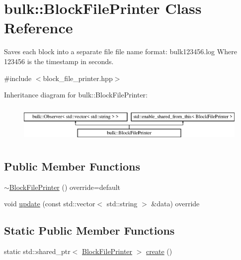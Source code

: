 \hypertarget{classbulk_1_1BlockFilePrinter}{}\section{bulk\+:\+:Block\+File\+Printer Class Reference}
\label{classbulk_1_1BlockFilePrinter}


Saves each block into a separate file file name format\+: bulk123456.\+log Where 123456 is the timestamp in seconds.  




{\ttfamily \#include $<$block\+\_\+file\+\_\+printer.\+hpp$>$}

Inheritance diagram for bulk\+:\+:Block\+File\+Printer\+:\begin{figure}[H]
\begin{center}
\leavevmode
\includegraphics[height=1.879195cm]{classbulk_1_1BlockFilePrinter}
\end{center}
\end{figure}
\subsection*{Public Member Functions}
\begin{DoxyCompactItemize}
\item 
\hyperlink{classbulk_1_1BlockFilePrinter_af93de98e11a9c3881ab6bbc7ab90de61}{$\sim$\+Block\+File\+Printer} () override=default
\item 
void \hyperlink{classbulk_1_1BlockFilePrinter_a3e8a6eaf52ef8bef0fa9ec0b298c7382}{update} (const std\+::vector$<$ std\+::string $>$ \&data) override
\end{DoxyCompactItemize}
\subsection*{Static Public Member Functions}
\begin{DoxyCompactItemize}
\item 
static std\+::shared\+\_\+ptr$<$ \hyperlink{classbulk_1_1BlockFilePrinter}{Block\+File\+Printer} $>$ \hyperlink{classbulk_1_1BlockFilePrinter_a595744d305a5ffedce26f5a1a764142b}{create} ()
\end{DoxyCompactItemize}


